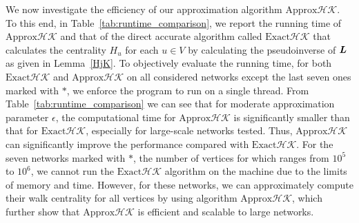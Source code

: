 \documentclass[journal]{IEEEtran}
\begin{document}
We now investigate the efficiency of our approximation algorithm \(\text{Approx}\mathcal{HK}\). To this end, in Table~\ref{tab:runtime_comparison}, we report the running time of \(\text{Approx}\mathcal{HK}\) and that of the direct accurate algorithm called \(\text{Exact}\mathcal{HK}\) that calculates the centrality \(H_u\) for each \(u \in V\) by calculating the pseudoinverse of \(\boldsymbol{L}\) as given  in Lemma~\ref{HjK}. To objectively evaluate the running time, for both \(\text{Exact}\mathcal{HK}\) and \(\text{Approx}\mathcal{HK}\) on all considered networks except the last seven ones marked with \(\ast\), we enforce the program to run on a single thread.  From Table~\ref{tab:runtime_comparison} we can see that for  moderate approximation parameter \(\epsilon\), the computational time for \(\text{Approx}\mathcal{HK}\) is significantly  smaller than  that  for \(\text{Exact}\mathcal{HK}\), especially for large-scale networks tested.  Thus,   \(\text{Approx}\mathcal{HK}\) can significantly improve the performance compared with  \(\text{Exact}\mathcal{HK}\). For the  seven networks marked with \(\ast\), the number of vertices for which ranges from \(10^5\) to \(10^6\), we cannot run the \(\text{Exact}\mathcal{HK}\) algorithm on the machine due to the limits of memory and time. However, for these networks, we can approximately compute their walk centrality for all vertices by using algorithm \(\text{Approx}\mathcal{HK}\), which further show that   \(\text{Approx}\mathcal{HK}\) is  efficient and scalable to large networks.
\end{document}

